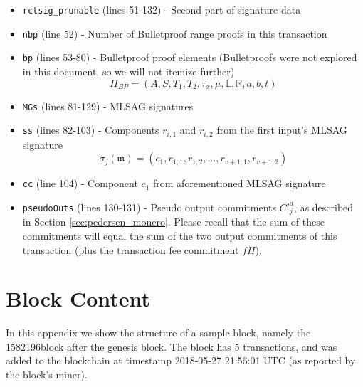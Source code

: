 \begin{appendices}
\begin{itemize}
    \item {\tt rctsig\_prunable} (lines 51-132) - Second part of signature data
    \item {\tt nbp} (line 52) - Number of Bulletproof range proofs in this transaction
    \item {\tt bp} (lines 53-80) - Bulletproof proof elements (Bulletproofs were not explored in this document, so we will not itemize further)\vspace{.175cm}
    \[\Pi_{BP} = (A, S, T_1, T_2, \tau_x, \mu, \mathbb{L}, \mathbb{R}, a, b, t)\]
    \item {\tt MGs} (lines 81-129) - MLSAG signatures
    \item {\tt ss} (lines 82-103) - Components \(r_{i,1}\) and \(r_{i,2}\) from the first input's MLSAG signature\vspace{.175cm}
    \[\sigma_j(\mathfrak{m}) = (c_1, r_{1, 1}, r_{1, 2}, ..., r_{v+1, 1}, r_{v+1, 2})\]
    \item {\tt cc} (line 104) - Component \(c_1\) from aforementioned MLSAG signature
    \item {\tt pseudoOuts} (lines 130-131) - Pseudo output commitments $C'^a_j$, as described in Section  \ref{sec:pedersen_monero}. Please recall that the sum of these commitments will equal the sum of the two output commitments of this transaction (plus the transaction fee commitment $f H$).
\end{itemize}




\chapter{Block Content}
\label{appendix:block-content}

In this appendix we show the structure of a sample block, namely the 1582196\nth block after the genesis block. The block has 5 transactions, and was added to the blockchain at timestamp 2018-05-27 21:56:01 UTC (as reported by the block's miner).


\end{appendices}
